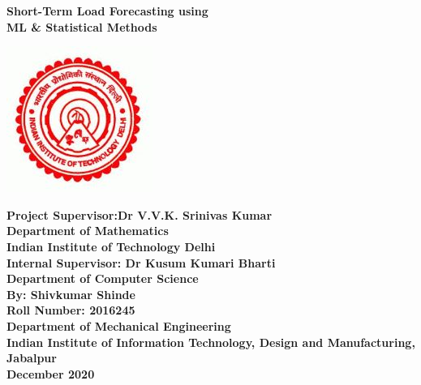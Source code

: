 \documentclass{article}
\begin{document}
\begin{titlepage}
\begin{center}

\huge{\bfseries Short-Term Load Forecasting using}\\
\huge{\bfseries ML \& Statistical Methods}\\
\vspace{0.2in}

\includegraphics[scale=1]{IIT_Delhi.png}


\vspace{0.2in}
\large{\bfseries Project Supervisor:Dr V.V.K. Srinivas Kumar}\\
[0.1 in]

\large {\bfseries Department of Mathematics}\\
\large{\bfseries Indian Institute of Technology Delhi}\\
[1 cm]

\large{\bfseries Internal Supervisor: Dr Kusum Kumari Bharti }\\
[0.1 in]
\large {\bfseries Department of Computer Science}\\
[1cm]

\large{\bfseries By: Shivkumar Shinde}\\
\large{\bfseries Roll Number: 2016245}\\
[0.1 in]
\large{\bfseries Department of Mechanical Engineering}\\
[1cm]

\large{\bfseries Indian Institute of Information Technology, Design  and Manufacturing, Jabalpur}\\
[2cm]
\large{\bfseries December 2020}

\end{center}
\end{titlepage}
\end{document}
